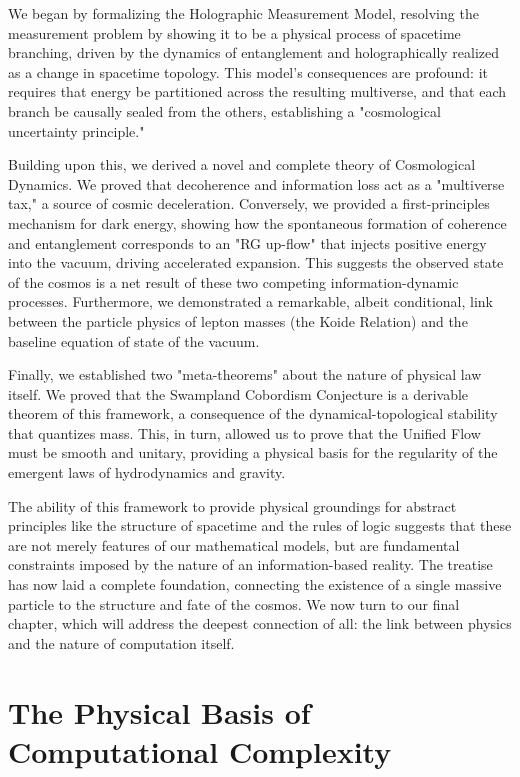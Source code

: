 \documentclass[11pt, letterpaper]{report}
\theoremstyle{plain} %
\theoremstyle{definition} %
\theoremstyle{remark} %
\begin{document}
We began by formalizing the Holographic Measurement Model, resolving the measurement problem by showing it to be a physical process of spacetime branching, driven by the dynamics of entanglement and holographically realized as a change in spacetime topology. This model's consequences are profound: it requires that energy be partitioned across the resulting multiverse, and that each branch be causally sealed from the others, establishing a "cosmological uncertainty principle."

Building upon this, we derived a novel and complete theory of Cosmological Dynamics. We proved that decoherence and information loss act as a "multiverse tax," a source of cosmic deceleration. Conversely, we provided a first-principles mechanism for dark energy, showing how the spontaneous formation of coherence and entanglement corresponds to an "RG up-flow" that injects positive energy into the vacuum, driving accelerated expansion. This suggests the observed state of the cosmos is a net result of these two competing information-dynamic processes. Furthermore, we demonstrated a remarkable, albeit conditional, link between the particle physics of lepton masses (the Koide Relation) and the baseline equation of state of the vacuum.

Finally, we established two "meta-theorems" about the nature of physical law itself. We proved that the Swampland Cobordism Conjecture is a derivable theorem of this framework, a consequence of the dynamical-topological stability that quantizes mass. This, in turn, allowed us to prove that the Unified Flow must be smooth and unitary, providing a physical basis for the regularity of the emergent laws of hydrodynamics and gravity.

The ability of this framework to provide physical groundings for abstract principles like the structure of spacetime and the rules of logic suggests that these are not merely features of our mathematical models, but are fundamental constraints imposed by the nature of an information-based reality. The treatise has now laid a complete foundation, connecting the existence of a single massive particle to the structure and fate of the cosmos. We now turn to our final chapter, which will address the deepest connection of all: the link between physics and the nature of computation itself.



\chapter{The Physical Basis of Computational Complexity}
\label{chap:computation}
\end{document}
